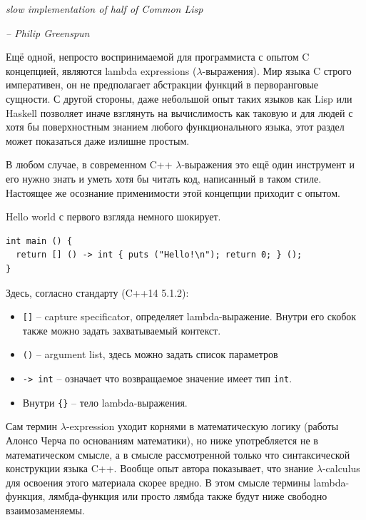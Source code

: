 \documentclass[a4paper,12pt,oneside]{book}
\begin{document}
\hfill\textit{slow implementation of half of Common Lisp}{\vspace{0.5em}}

\hfill\textit{-- Philip Greenspun}

Ещё одной, непросто воспринимаемой для программиста с опытом C концепцией, являются lambda expressions ($\lambda$-выражения). Мир языка C строго императивен, он не предполагает абстракции функций в перворанговые сущности. С другой стороны, даже небольшой опыт таких языков как Lisp или Haskell позволяет иначе взглянуть на вычислимость как таковую и для людей с хотя бы поверхностным знанием любого функционального языка, этот раздел может показаться даже излишне простым.

В любом случае, в современном C++ $\lambda$-выражения это ещё один инструмент и его нужно знать и уметь хотя бы читать код, написанный в таком стиле. Настоящее же осознание применимости этой концепции приходит с опытом. 

Hello world с первого взгляда немного шокирует.

\begin{lstlisting}
int main () {
  return [] () -> int { puts ("Hello!\n"); return 0; } (); 
}
\end{lstlisting}

Здесь, согласно стандарту (C++14 5.1.2): 

\begin{itemize}
\item \lstinline![]! -- capture specificator, определяет lambda-выражение. Внутри его скобок также можно задать захватываемый контекст.

\item \lstinline!()! -- argument list, здесь можно задать список параметров

\item \lstinline!-> int! -- означает что возвращаемое значение имеет тип \lstinline!int!.

\item Внутри \lstinline!{}! -- тело lambda-выражения.
\end{itemize}

Сам термин $\lambda$-expression уходит корнями в математическую логику (работы Алонсо Черча по основаниям математики), но ниже употребляется не в математическом смысле, а в смысле рассмотренной только что синтаксической конструкции языка C++. Вообще опыт автора показывает, что знание $\lambda$-calculus для освоения этого материала скорее вредно. В этом смысле термины lambda-функция, лямбда-функция или просто лямбда также будут ниже свободно взаимозаменяемы.
\end{document}
